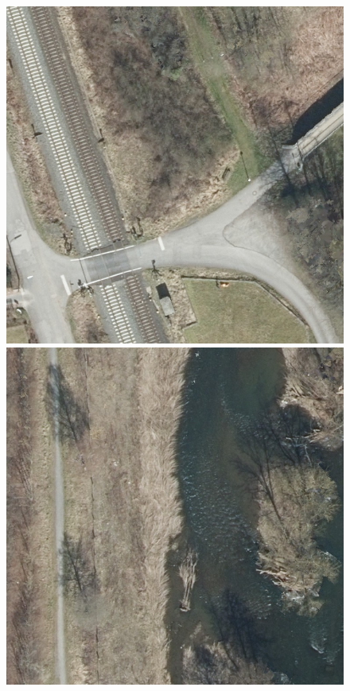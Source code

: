 \begin{figure}
    \hspace{1mm}
    \includegraphics[width=\LabelConsiderationImageWidth]{images/consideration_labels/69493}
    \hspace{1mm}
    \includegraphics[width=\LabelConsiderationImageWidth]{images/consideration_labels/71270}


\end{figure}
